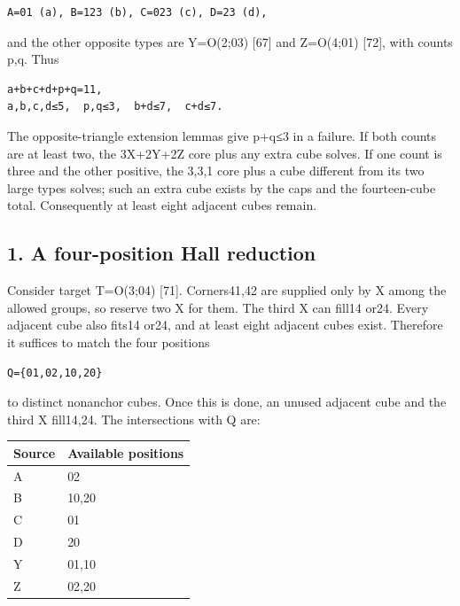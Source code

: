 \documentclass[
  10pt,
]{article}
\begin{document}
\begin{verbatim}
A=01 (a), B=123 (b), C=023 (c), D=23 (d),
\end{verbatim}

and the other opposite types are Y=O(2;03) {[}67{]} and
Z=O(4;01) {[}72{]}, with counts p,q. Thus

\begin{verbatim}
a+b+c+d+p+q=11,
a,b,c,d≤5,  p,q≤3,  b+d≤7,  c+d≤7.
\end{verbatim}

The opposite-triangle extension lemmas give p+q≤3 in a failure. If both
counts are at least two, the 3X+2Y+2Z core plus any extra cube solves.
If one count is three and the other positive, the 3,3,1 core plus a cube
different from its two large types solves; such an extra cube exists by
the caps and the fourteen-cube total. Consequently at least eight
adjacent cubes remain.

\hypertarget{a-four-position-hall-reduction}{%
\subsection*{1. A four-position Hall
reduction}\label{a-four-position-hall-reduction}}

Consider target T=O(3;04) {[}71{]}. Corners41,42 are supplied
only by X among the allowed groups, so reserve two X for them. The third
X can fill14 or24. Every adjacent cube also fits14 or24, and at least
eight adjacent cubes exist. Therefore it suffices to match the four
positions

\begin{verbatim}
Q={01,02,10,20}
\end{verbatim}

to distinct nonanchor cubes. Once this is done, an unused adjacent cube
and the third X fill14,24. The intersections with Q are:

\begin{longtable}[]{@{}ll@{}}
\toprule\noalign{}
Source & Available positions \\
\midrule\noalign{}
\endhead
\bottomrule\noalign{}
\endlastfoot
A & 02 \\
B & 10,20 \\
C & 01 \\
D & 20 \\
Y & 01,10 \\
Z & 02,20 \\
\end{longtable}
\end{document}
